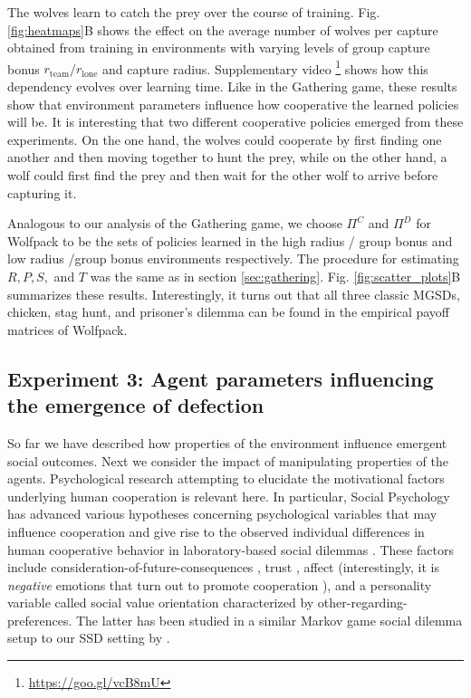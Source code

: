 \documentclass{aamas2017}
\begin{document}
The wolves learn to catch the prey over the course of training. Fig. \ref{fig:heatmaps}B shows the effect on the average number of wolves per capture obtained from training in environments with varying levels of group capture bonus $r_{\text{team}}/r_{\text{lone}}$ and capture radius. Supplementary video \footnote{\href{https://goo.gl/vcB8mU}{https://goo.gl/vcB8mU}} shows how this dependency evolves over learning time. Like in the Gathering game, these results show that environment parameters influence how cooperative the learned policies will be. It is interesting that two different cooperative policies emerged from these experiments. On the one hand, the wolves could cooperate by first finding one another and then moving together to hunt the prey, while on the other hand, a wolf could first find the prey and then wait for the other wolf to arrive before capturing it.

Analogous to our analysis of the Gathering game, we choose $\Pi^C$ and $\Pi^D$ for Wolfpack to be the sets of policies learned in the high radius / group bonus and low radius /group bonus environments respectively. The procedure for estimating $R,P,S,$ and $T$ was the same as in section \ref{sec:gathering}. Fig. \ref{fig:scatter_plots}B summarizes these results. Interestingly, it turns out that all three classic MGSDs, chicken, stag hunt, and prisoner's dilemma can be found in the empirical payoff matrices of Wolfpack.

\subsection{Experiment 3: Agent parameters influencing the emergence of defection}\label{sec:comparison}
So far we have described how properties of the environment influence emergent social outcomes. Next we consider the impact of manipulating properties of the agents. Psychological research attempting to elucidate the motivational factors underlying human cooperation is relevant here. In particular, Social Psychology has advanced various hypotheses concerning psychological variables that may influence cooperation and give rise to the observed individual differences in human cooperative behavior in laboratory-based social dilemmas \cite{van2013psychology}. These factors include consideration-of-future-consequences \cite{kortenkamp2006time}, trust \cite{parks1995high}, affect (interestingly, it is \emph{negative} emotions that turn out to promote cooperation \cite{tan2010happiness}), and a personality variable called social value orientation characterized by other-regarding-preferences. The latter has been studied in a similar Markov game social dilemma setup to our SSD setting by \cite{Austerweil16}.
\end{document}
